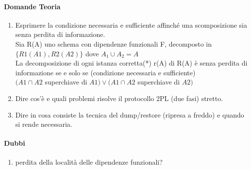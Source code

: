 \documentclass[12pt]{article}
\begin{document}
\paragraph{Domande Teoria}
\begin{enumerate}
    \item Esprimere la condizione necessaria e sufficiente affinché una scomposizione sia senza perdita di informazione. \\
    Sia R(A) uno schema con dipendenze funzionali F, decomposto in $\{R1(A1), R2(A2)\}$ dove $A_1 \cup A_2 = A$ \\
    La decomposizione di ogni istanza corretta(*) r(A) di  R(A) è senza perdita di informazione se e solo se  (condizione necessaria e sufficiente) \\  
    $(A1\cap A2$ superchiave di $A1)\vee(A1 \cap A2 $ superchiave di $A2) $
    \item Dire cos’è e quali problemi risolve il protocollo 2PL (due fasi) stretto. 
    \item Dire in cosa consiste la tecnica del dump/restore (ripresa a freddo) e quando si rende necessaria. 
\end{enumerate}

\paragraph{Dubbi}
\begin{enumerate}
    \item perdita della località delle dipendenze funzionali?
\end{enumerate}
\end{document}
